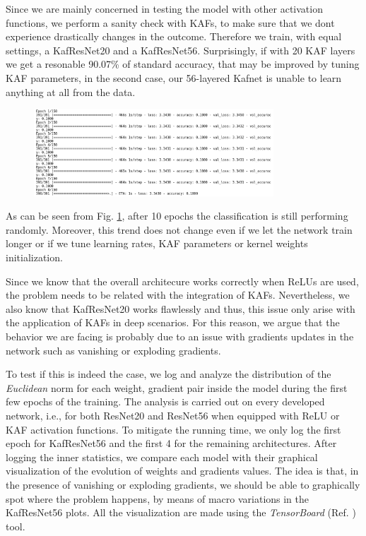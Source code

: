 \documentclass[LaM,binding=0.6cm]{./packages/sapthesis/sapthesis}
\begin{document}
        Since we are mainly concerned in testing the model with other activation functions, we perform a sanity check with KAFs, to make sure that we dont experience drastically 
        changes in the outcome. Therefore we train, with equal settings, a KafResNet20 and a KafResNet56. Surprisingly, if with 20 KAF layers we get a resonable 90.07\% of standard accuracy, that may be 
        improved by tuning KAF parameters, in the second case, our 56-layered Kafnet is unable to learn anything at all from the data. 
        \begin{figure}[h!]
            \centering
            \includegraphics[width=0.8\textwidth]{explgrad.png}
            \caption{}
            \label{fig:explgrad}
        \end{figure} 
        As can be seen from Fig. \ref{fig:explgrad}, after 10 epochs the classification is still performing randomly. Moreover, this trend does not change even if we let the network train longer or if we tune learning rates, KAF parameters 
        or kernel weights initialization. 
        
        Since we know that the overall architecure works correctly when ReLUs are used, the problem needs to be related with the integration of KAFs. Nevertheless, we also know that KafResNet20 works flawlessly and thus,
        this issue only arise with the application of KAFs in deep scenarios. For this reason, we argue that the behavior we are facing is probably due to an issue with gradients updates in the network such as 
        vanishing or exploding gradients.

        To test if this is indeed the case, we log and analyze the distribution of the \textit{Euclidean} norm for each weight, gradient pair inside the model during the first few epochs of the training. The analysis is carried out 
        on every developed network, i.e., for both ResNet20 and ResNet56 when equipped with ReLU or KAF activation functions. To mitigate the running time, we only log the first epoch for KafResNet56 and the first 4 for the remaining architectures.
        After logging the inner statistics, we compare each model with their graphical visualization of the
        evolution of weights and gradients values. The idea is that, in the presence of vanishing or exploding gradients, we should be able to graphically spot where the problem happens, by means of macro variations in the 
        KafResNet56 plots. All the visualization are made using the \textit{TensorBoard} (Ref. ) tool.
        
\end{document}

